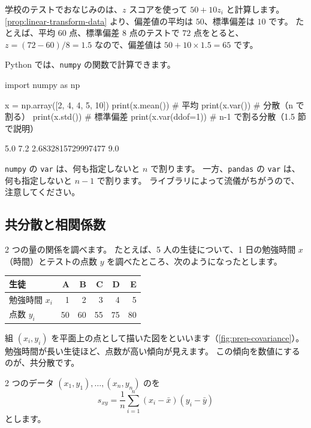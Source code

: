 \begin{example}[偏差値][ex:hensachi]
  学校のテストでおなじみのは、$z$ スコアを使って $50 + 10 z_i$ と計算します。
  \cref{prop:linear-transform-data} より、偏差値の平均は $50$、標準偏差は $10$ です。
  たとえば、平均 $60$ 点、標準偏差 $8$ 点のテストで $72$ 点をとると、
  $z = (72 - 60)/8 = 1.5$ なので、偏差値は $50 + 10 \times 1.5 = 65$ です。
\end{example}

Python では、\texttt{numpy} の関数で計算できます。

\begin{pycode}[平均・分散・標準偏差]
import numpy as np

x = np.array([2, 4, 4, 5, 10])
print(x.mean())        # 平均
print(x.var())         # 分散（n で割る）
print(x.std())         # 標準偏差
print(x.var(ddof=1))   # n-1 で割る分散（1.5 節で説明）
\end{pycode}

\begin{pyoutput}
5.0
7.2
2.6832815729997477
9.0
\end{pyoutput}

\texttt{numpy} の \texttt{var} は、何も指定しないと $n$ で割ります。
一方、\texttt{pandas} の \texttt{var} は、何も指定しないと $n-1$ で割ります。
ライブラリによって流儀がちがうので、注意してください。

\subsection{共分散と相関係数}

2 つの量の関係を調べます。
たとえば、5 人の生徒について、1 日の勉強時間 $x$（時間）とテストの点数 $y$ を調べたところ、次のようになったとします。
\begin{center}
  \begin{tabular}{lrrrrr}
    \toprule
    生徒 & A & B & C & D & E \\
    \midrule
    勉強時間 $x_i$ & 1 & 2 & 3 & 4 & 5 \\
    点数 $y_i$ & 50 & 60 & 55 & 75 & 80 \\
    \bottomrule
  \end{tabular}
\end{center}
組 $(x_i, y_i)$ を平面上の点として描いた図をといいます（\cref{fig:prep-covariance}）。
勉強時間が長い生徒ほど、点数が高い傾向が見えます。
この傾向を数値にするのが、共分散です。

\begin{definition}
  2 つのデータ $(x_1, y_1), \dots, (x_n, y_n)$ のを
  \[
    s_{xy} = \frac{1}{n} \sum_{i=1}^{n} (x_i - \bar{x})(y_i - \bar{y})
  \]
  とします。
\end{definition}

